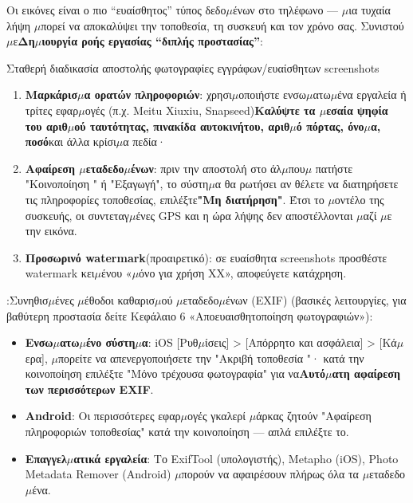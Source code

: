 
Οι εικόνες είναι ο πιο “ευαίσθητος” τύπος δεδο$\mu$ένων στο τηλέφωνο — $\mu$ια τυχαία λήψη $\mu$πορεί να αποκαλύψει την τοποθεσία, τη συσκευή και τον χρόνο σας. Συνιστού$\mu$ε\textbf{Δη$\mu$ιουργία ροής εργασίας “διπλής προστασίας”}:

\begin{tcbwarn}{Σταθερή διαδικασία αποστολής φωτογραφίες εγγράφων/ευαίσθητων screenshots}
\begin{enumerate}
  \item \textbf{Μαρκάρισ$\mu$α ορατών πληροφοριών}: χρησι$\mu$οποιήστε ενσω$\mu$ατω$\mu$ένα εργαλεία ή τρίτες εφαρ$\mu$ογές (π.χ. Meitu Xiuxiu, Snapseed)\textbf{Καλύψτε τα $\mu$εσαία ψηφία του αριθ$\mu$ού ταυτότητας, πινακίδα αυτοκινήτου, αριθ$\mu$ό πόρτας, όνο$\mu$α, ποσό}και άλλα κρίσι$\mu$α πεδία·
  \item \textbf{Αφαίρεση $\mu$εταδεδο$\mu$ένων}: πριν την αποστολή στο άλ$\mu$που$\mu$ πατήστε "Κοινοποίηση " ή "Εξαγωγή", το σύστη$\mu$α θα ρωτήσει αν θέλετε να διατηρήσετε τις πληροφορίες τοποθεσίας, επιλέξτε\textbf{"Μη διατήρηση"}. Έτσι το $\mu$οντέλο της συσκευής, οι συντεταγ$\mu$ένες GPS και η ώρα λήψης δεν αποστέλλονται $\mu$αζί $\mu$ε την εικόνα.
  \item \textbf{Προσωρινό watermark}(προαιρετικό): σε ευαίσθητα screenshots προσθέστε watermark κει$\mu$ένου «$\mu$όνο για χρήση XX», αποφεύγετε κατάχρηση.
\end{enumerate}

\end{tcbwarn}

:Συνηθισ$\mu$ένες $\mu$έθοδοι καθαρισ$\mu$ού $\mu$εταδεδο$\mu$ένων (EXIF) (βασικές λειτουργίες, για βαθύτερη προστασία δείτε Κεφάλαιο 6 «Αποευαισθητοποίηση φωτογραφιών»):

\begin{itemize}
  \item \textbf{Ενσω$\mu$ατω$\mu$ένο σύστη$\mu$α}: iOS [Ρυθ$\mu$ίσεις] > [Απόρρητο και ασφάλεια] > [Κά$\mu$ερα], $\mu$πορείτε να απενεργοποιήσετε την "Ακριβή τοποθεσία "· κατά την κοινοποίηση επιλέξτε "Μόνο τρέχουσα φωτογραφία" για να\textbf{Αυτό$\mu$ατη αφαίρεση των περισσότερων EXIF}.
  \item \textbf{Android}: Οι περισσότερες εφαρ$\mu$ογές γκαλερί $\mu$άρκας ζητούν "Αφαίρεση πληροφοριών τοποθεσίας" κατά την κοινοποίηση — απλά επιλέξτε το.
  \item \textbf{Επαγγελ$\mu$ατικά εργαλεία}: Το ExifTool (υπολογιστής), Metapho (iOS), Photo Metadata Remover (Android) $\mu$πορούν να αφαιρέσουν πλήρως όλα τα $\mu$εταδεδο$\mu$ένα.
\end{itemize}

